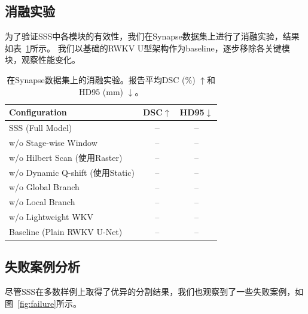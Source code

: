\documentclass[conference]{IEEEtran}   %
\begin{document}

\subsection{消融实验}
为了验证SSS中各模块的有效性，我们在Synapse数据集上进行了消融实验，结果如表~\ref{tab:ablation}所示。
我们以基础的RWKV U型架构作为baseline，逐步移除各关键模块，观察性能变化。

\begin{table}[t]
\centering
\caption{在Synapse数据集上的消融实验。报告平均DSC (\%) $\uparrow$和HD95 (mm) $\downarrow$。}
\label{tab:ablation}
\begin{tabular}{lcc}
\toprule
Configuration & DSC$\uparrow$ & HD95$\downarrow$ \\
\midrule
SSS (Full Model)                   & \textbf{--} & \textbf{--} \\
\midrule
w/o Stage-wise Window              & --    & --    \\
w/o Hilbert Scan (使用Raster)       & --    & --    \\
w/o Dynamic Q-shift (使用Static)    & --    & --    \\
w/o Global Branch                  & --    & --    \\
w/o Local Branch                   & --    & --    \\
w/o Lightweight WKV               & --    & --    \\
\midrule
Baseline (Plain RWKV U-Net)        & --    & --    \\
\bottomrule
\end{tabular}
\end{table}



\subsection{失败案例分析}
尽管SSS在多数样例上取得了优异的分割结果，我们也观察到了一些失败案例，如图~\ref{fig:failure}所示。
\end{document}

